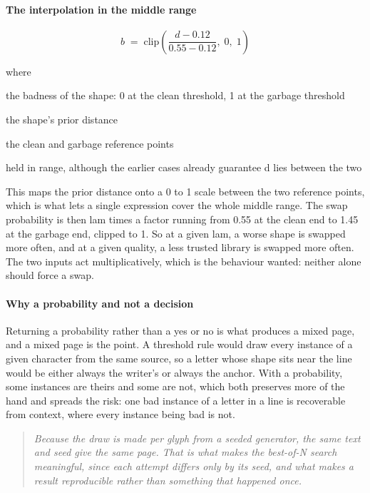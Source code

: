 \paragraph{The interpolation in the middle range}

\begin{equation}
b \;=\; \mathrm{clip}\!\left( \frac{d - 0.12}{0.55 - 0.12},\; 0,\; 1 \right)
\end{equation}

\noindent where
\begin{description}[leftmargin=2.4em,style=nextline,font=\normalfont\ttfamily]\setlength\itemsep{1pt}
  \item[{$b$}] \normalfont the badness of the shape: 0 at the clean threshold, 1 at the garbage threshold
  \item[{$d$}] \normalfont the shape's prior distance
  \item[{$0.12,\;0.55$}] \normalfont the clean and garbage reference points
  \item[{$\mathrm{clip}(\cdot,0,1)$}] \normalfont held in range, although the earlier cases already guarantee d lies between the two
\end{description}
This maps the prior distance onto a 0 to 1 scale between the two reference points, which is what lets a single expression cover the whole middle range. The swap probability is then lam times a factor running from 0.55 at the clean end to 1.45 at the garbage end, clipped to 1. So at a given lam, a worse shape is swapped more often, and at a given quality, a less trusted library is swapped more often. The two inputs act multiplicatively, which is the behaviour wanted: neither alone should force a swap.


\paragraph{Why a probability and not a decision}
Returning a probability rather than a yes or no is what produces a mixed page, and a mixed page is the point. A threshold rule would draw every instance of a given character from the same source, so a letter whose shape sits near the line would be either always the writer's or always the anchor. With a probability, some instances are theirs and some are not, which both preserves more of the hand and spreads the risk: one bad instance of a letter in a line is recoverable from context, where every instance being bad is not.


\begin{quote}\small\itshape Because the draw is made per glyph from a seeded generator, the same text and seed give the same page. That is what makes the best-of-N search meaningful, since each attempt differs only by its seed, and what makes a result reproducible rather than something that happened once.\end{quote}

